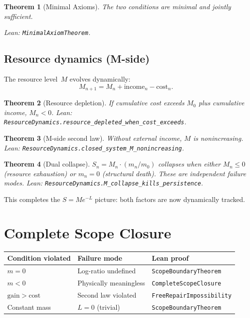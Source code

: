 \documentclass[11pt,a4paper]{article}
\newtheorem{theorem}{Theorem}
\begin{document}
\begin{theorem}[Minimal Axioms]
The two conditions are minimal and jointly sufficient.

Lean: \texttt{MinimalAxiomTheorem}.
\end{theorem}

\subsection{Resource dynamics (M-side)}

The resource level~$M$ evolves dynamically:
\[
M_{n+1} = M_n + \mathrm{income}_n - \mathrm{cost}_n.
\]

\begin{theorem}[Resource depletion]
If cumulative cost exceeds $M_0$ plus cumulative income, $M_n < 0$.
Lean: \texttt{ResourceDynamics.resource\_depleted\_when\_cost\_exceeds}.
\end{theorem}

\begin{theorem}[M-side second law]
Without external income, $M$ is nonincreasing.
Lean: \texttt{ResourceDynamics.closed\_system\_M\_nonincreasing}.
\end{theorem}

\begin{theorem}[Dual collapse]
$S_n = M_n \cdot (m_n/m_0)$ collapses when \emph{either} $M_n \leq 0$ (resource exhaustion) \emph{or} $m_n = 0$ (structural death). These are independent failure modes.
Lean: \texttt{ResourceDynamics.M\_collapse\_kills\_persistence}.
\end{theorem}

This completes the $S = Me^{-L}$ picture: both factors are now dynamically tracked.

\section{Complete Scope Closure}

\begin{center}
\begin{tabular}{lll}
\toprule
Condition violated & Failure mode & Lean proof \\
\midrule
$m=0$ & Log-ratio undefined & \texttt{ScopeBoundaryTheorem} \\
$m<0$ & Physically meaningless & \texttt{CompleteScopeClosure} \\
$\mathrm{gain}>\mathrm{cost}$ & Second law violated & \texttt{FreeRepairImpossibility} \\
Constant mass & $L=0$ (trivial) & \texttt{ScopeBoundaryTheorem} \\
\bottomrule
\end{tabular}
\end{center}
\end{document}
